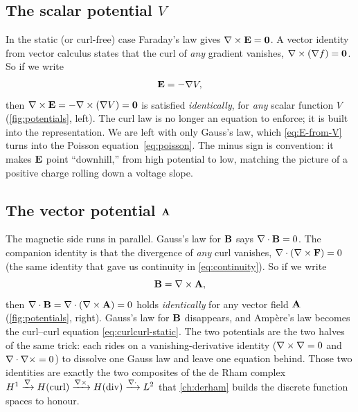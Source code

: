 \subsection{The scalar potential \texorpdfstring{$V$}{V}}

In the static (or curl-free) case Faraday's law gives $\nabla\times\mathbf{E}=\bm0$. A vector
identity from vector calculus states that the curl of \emph{any} gradient
vanishes, $\nabla\times(\nabla f)=\bm0$. So if we write
\begin{equation}
  \mathbf{E} = -\nabla V, \label{eq:E-from-V}
\end{equation}
then $\nabla\times\mathbf{E} = -\nabla\times(\nabla V)=\bm 0$ is satisfied \emph{identically}, for
\emph{any} scalar function $V$ (\cref{fig:potentials}, left). The curl law is no
longer an equation to enforce; it is built into the representation. We are left
with only Gauss's law, which \eqref{eq:E-from-V} turns into the Poisson
equation~\eqref{eq:poisson}. The minus sign is convention: it makes $\mathbf{E}$ point
``downhill,'' from high potential to low, matching the picture of a positive
charge rolling down a voltage slope.

\subsection{The vector potential \texorpdfstring{$\mathbf{A}$}{A}}

The magnetic side runs in parallel. Gauss's law for $\mathbf{B}$ says $\nabla\cdot\mathbf{B}=0$.
The companion identity is that the divergence of \emph{any} curl vanishes,
$\nabla\cdot(\nabla\times\mathbf{F})=0$ (the same identity that gave us continuity in
\eqref{eq:continuity}). So if we write
\begin{equation}
  \mathbf{B} = \nabla\times\mathbf{A}, \label{eq:B-from-A}
\end{equation}
then $\nabla\cdot\mathbf{B}=\nabla\cdot(\nabla\times\mathbf{A})=0$ holds \emph{identically} for any vector field
$\mathbf{A}$ (\cref{fig:potentials}, right). Gauss's law for $\mathbf{B}$ disappears, and
Amp\`ere's law becomes the curl--curl equation
\eqref{eq:curlcurl-static}. The two potentials are the two halves of the same
trick: each rides on a vanishing-derivative identity ($\nabla\times\nabla=0$ and
$\nabla\cdot\nabla\times=0$) to dissolve one Gauss law and leave one equation behind. Those
two identities are exactly the two composites of the de Rham complex
$H^1\xrightarrow{\nabla}H(\mathrm{curl})\xrightarrow{\nabla\times}H(\mathrm{div})\xrightarrow{\nabla\cdot}L^2$
that \cref{ch:derham} builds the discrete function spaces to honour.

